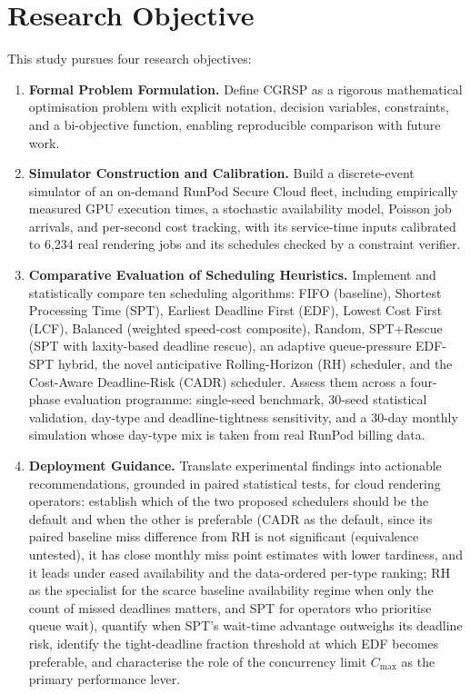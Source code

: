\section{Research Objective}
\label{sec:research-objective}

This study pursues four research objectives:

\begin{enumerate}

\item \textbf{Formal Problem Formulation.} Define CGRSP as a rigorous mathematical optimisation problem with explicit notation, decision variables, constraints, and a bi-objective function, enabling reproducible comparison with future work.

\item \textbf{Simulator Construction and Calibration.} Build a discrete-event simulator of an on-demand RunPod Secure Cloud fleet, including empirically measured GPU execution times, a stochastic availability model, Poisson job arrivals, and per-second cost tracking, with its service-time inputs calibrated to 6,234 real rendering jobs and its schedules checked by a constraint verifier.

\item \textbf{Comparative Evaluation of Scheduling Heuristics.} Implement and statistically compare ten scheduling algorithms: FIFO (baseline), Shortest Processing Time (SPT), Earliest Deadline First (EDF), Lowest Cost First (LCF), Balanced (weighted speed-cost composite), Random, SPT+Rescue (SPT with laxity-based deadline rescue), an adaptive queue-pressure EDF-SPT hybrid, the novel anticipative Rolling-Horizon (RH) scheduler, and the Cost-Aware Deadline-Risk (CADR) scheduler. Assess them across a four-phase evaluation programme: single-seed benchmark, 30-seed statistical validation, day-type and deadline-tightness sensitivity, and a 30-day monthly simulation whose day-type mix is taken from real RunPod billing data.

\item \textbf{Deployment Guidance.} Translate experimental findings into actionable recommendations, grounded in paired statistical tests, for cloud rendering operators: establish which of the two proposed schedulers should be the default and when the other is preferable (CADR as the default, since its paired baseline miss difference from RH is not significant (equivalence untested), it has close monthly miss point estimates with lower tardiness, and it leads under eased availability and the data-ordered per-type ranking; RH as the specialist for the scarce baseline availability regime when only the count of missed deadlines matters, and SPT for operators who prioritise queue wait), quantify when SPT's wait-time advantage outweighs its deadline risk, identify the tight-deadline fraction threshold at which EDF becomes preferable, and characterise the role of the concurrency limit $C_{\max}$ as the primary performance lever.

\end{enumerate}

